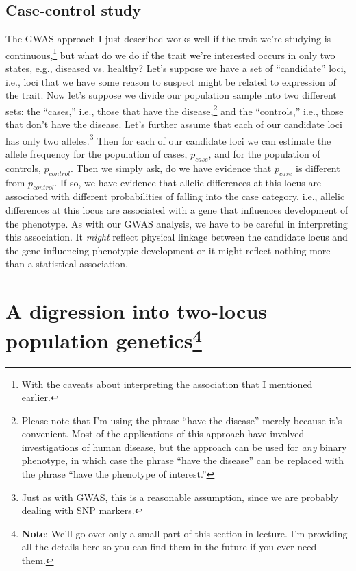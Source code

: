 \subsection*{Case-control study}

The GWAS approach I just described works well if the trait we're
studying is continuous,\footnote{With the caveats about interpreting
  the association that I mentioned earlier.} but what do we do if the
trait we're interested occurs in only two states, e.g., diseased
vs. healthy? Let's suppose we have a set of ``candidate'' loci, i.e.,
loci that we have some reason to suspect might be related to
expression of the trait. Now let's suppose we divide our population
sample into two different sets: the ``cases,'' i.e., those that have
the disease,\footnote{Please note that I'm using the phrase ``have the
  disease'' merely because it's convenient. Most of the applications
  of this approach have involved investigations of human disease, but
  the approach can be used for {\it any\/} binary phenotype, in which
  case the phrase ``have the disease'' can be replaced with the phrase
  ``have the phenotype of interest.''} and the ``controls,'' i.e.,
those that don't have the disease. Let's further assume that each of
our candidate loci has only two alleles.\footnote{Just as with GWAS,
  this is a reasonable assumption, since we are probably dealing with
  SNP markers.} Then for each of our candidate loci we can estimate
the allele frequency for the population of cases, $p_{case}$, and for
the population of controls, $p_{control}$. Then we simply ask, do we
have evidence that $p_{case}$ is different from $p_{control}$. If so,
we have evidence that allelic differences at this locus are associated
with different probabilities of falling into the case category, i.e.,
allelic differences at this locus are associated with a gene that
influences development of the phenotype. As with our GWAS analysis, we
have to be careful in interpreting this association. It {\it might\/}
reflect physical linkage between the candidate locus and the gene
influencing phenotypic development or it might reflect nothing more
than a statistical association.

\section*{A digression into two-locus population
  genetics\footnote{{\bf Note}: We'll go over only a small part of
  this section in lecture. I'm providing all the details here so you
  can find them in the future if you ever need them.}}

